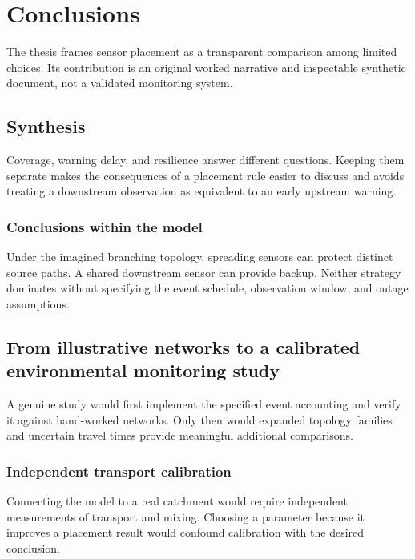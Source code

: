 \chapter{Conclusions}\label{demo-outlook}
The thesis frames sensor placement as a transparent comparison among limited choices. Its contribution is an original worked narrative and inspectable synthetic document, not a validated monitoring system.
\section{Synthesis}\label{demo-outlook-summary}
Coverage, warning delay, and resilience answer different questions. Keeping them separate makes the consequences of a placement rule easier to discuss and avoids treating a downstream observation as equivalent to an early upstream warning.
\subsection{Conclusions within the model}\label{demo-outlook-answer}
Under the imagined branching topology, spreading sensors can protect distinct source paths. A shared downstream sensor can provide backup. Neither strategy dominates without specifying the event schedule, observation window, and outage assumptions.
\section{From illustrative networks to a calibrated environmental monitoring study}\label{demo-outlook-next}
A genuine study would first implement the specified event accounting and verify it against hand-worked networks. Only then would expanded topology families and uncertain travel times provide meaningful additional comparisons.
\subsection{Independent transport calibration}\label{demo-outlook-calibration}
Connecting the model to a real catchment would require independent measurements of transport and mixing. Choosing a parameter because it improves a placement result would confound calibration with the desired conclusion.
